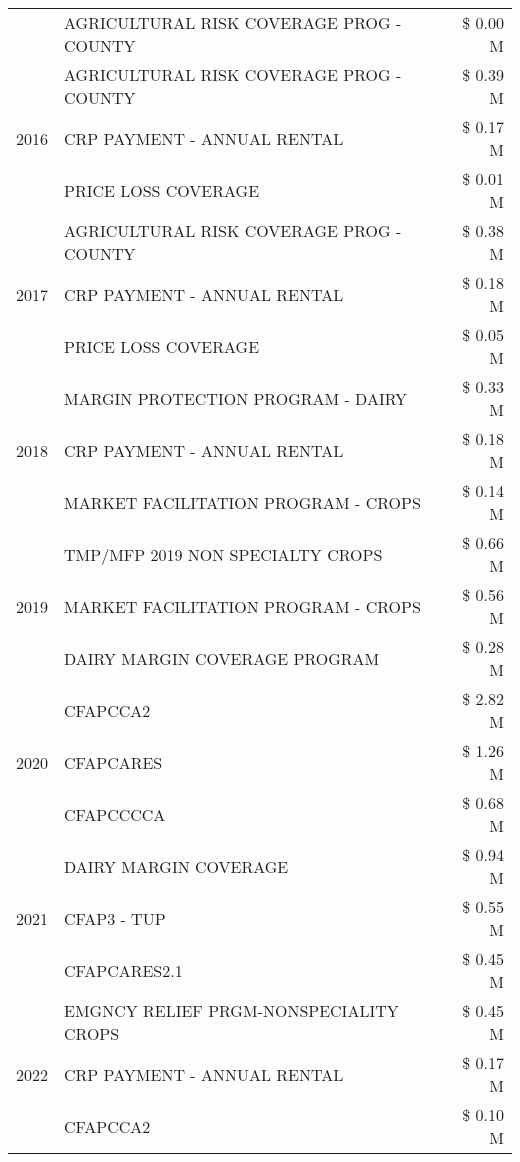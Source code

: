 \begin{tabular}{llr}
 & AGRICULTURAL RISK COVERAGE PROG - COUNTY & \$ 0.00 M \\
\cline{1-3}
\multirow[t]{3}{*}{2016} & AGRICULTURAL RISK COVERAGE PROG - COUNTY & \$ 0.39 M \\
 & CRP PAYMENT - ANNUAL RENTAL & \$ 0.17 M \\
 & PRICE LOSS COVERAGE & \$ 0.01 M \\
\cline{1-3}
\multirow[t]{3}{*}{2017} & AGRICULTURAL RISK COVERAGE PROG - COUNTY & \$ 0.38 M \\
 & CRP PAYMENT - ANNUAL RENTAL & \$ 0.18 M \\
 & PRICE LOSS COVERAGE & \$ 0.05 M \\
\cline{1-3}
\multirow[t]{3}{*}{2018} & MARGIN PROTECTION PROGRAM - DAIRY & \$ 0.33 M \\
 & CRP PAYMENT - ANNUAL RENTAL & \$ 0.18 M \\
 & MARKET FACILITATION PROGRAM - CROPS & \$ 0.14 M \\
\cline{1-3}
\multirow[t]{3}{*}{2019} & TMP/MFP 2019 NON SPECIALTY CROPS & \$ 0.66 M \\
 & MARKET FACILITATION PROGRAM - CROPS & \$ 0.56 M \\
 & DAIRY MARGIN COVERAGE PROGRAM & \$ 0.28 M \\
\cline{1-3}
\multirow[t]{3}{*}{2020} & CFAPCCA2 & \$ 2.82 M \\
 & CFAPCARES & \$ 1.26 M \\
 & CFAPCCCCA & \$ 0.68 M \\
\cline{1-3}
\multirow[t]{3}{*}{2021} & DAIRY MARGIN COVERAGE & \$ 0.94 M \\
 & CFAP3 - TUP & \$ 0.55 M \\
 & CFAPCARES2.1 & \$ 0.45 M \\
\cline{1-3}
\multirow[t]{3}{*}{2022} & EMGNCY RELIEF PRGM-NONSPECIALITY CROPS & \$ 0.45 M \\
 & CRP PAYMENT - ANNUAL RENTAL & \$ 0.17 M \\
 & CFAPCCA2 & \$ 0.10 M \\
\cline{1-3}
\bottomrule
\end{tabular}
